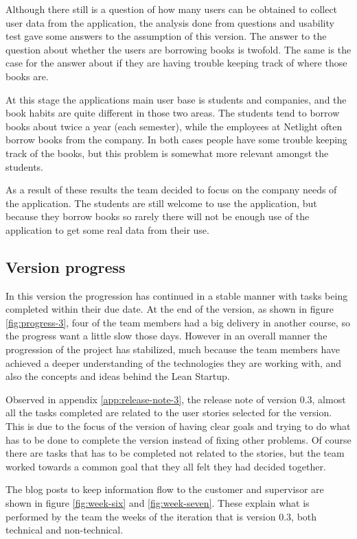 Although there still is a question of how many users can be obtained to collect user data from the application, the analysis done from questions and usability test gave some answers to the assumption of this version. The answer to the question about whether the users are borrowing books is twofold. The same is the case for the answer about if they are having trouble keeping track of where those books are.

At this stage the applications main user base is students and companies, and the book habits are quite different in those two areas. The students tend to borrow books about twice a year (each semester), while the employees at Netlight often borrow books from the company. In both cases people have some trouble keeping track of the books, but this problem is somewhat more relevant amongst the students. 

As a result of these results the team decided to focus on the company needs of the application. The students are still welcome to use the application, but because they borrow books so rarely there will not be enough use of the application to get some real data from their use. 


\subsection{Version progress}

In this version the progression has continued in a stable manner with tasks being completed within their due date. At the end of the version, as shown in figure \ref{fig:progress-3}, four of the team members had a big delivery in another course, so the progress want a little slow those days. However in an overall manner the progression of the project has stabilized, much because the team members have achieved a deeper understanding of the technologies they are working with, and also the concepts and ideas behind the Lean Startup.

Observed in appendix \ref{app:release-note-3}, the release note of version 0.3, almost all the tasks completed are related to the user stories selected for the version. This is due to the focus of the version of having clear goals and trying to do what has to be done to complete the version instead of fixing other problems. Of course there are tasks that has to be completed not related to the stories, but the team worked towards a common goal that they all felt they had decided together. 

The blog posts to keep information flow to the customer and supervisor are shown in figure \ref{fig:week-six} and \ref{fig:week-seven}. These explain what is performed by the team the weeks of the iteration that is version 0.3, both technical and non-technical.



